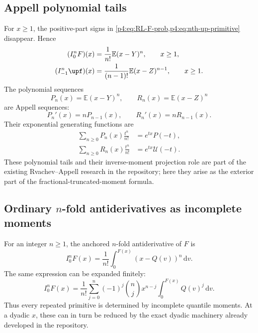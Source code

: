 \documentclass[11pt,oneside]{article}
\theoremstyle{definition}
\theoremstyle{remark}
\newcommand{\F}{F}
\newcommand{\Q}{Q}
\newcommand{\E}{\mathbb E}
\newcommand{\dd}{\,\mathrm d}
\newcommand{\1}{\mathbf 1}
\begin{document}
\subsection{Appell polynomial tails}

For \(x\ge1\), the positive-part signs in \cref{p4:eq:RL-F-prob,p4:eq:nth-up-primitive}
disappear.  Hence
\begin{align}
 (I_0^n\F)(x)&=\frac1{n!}\E(x-Y)^n,\qquad x\ge1,
 \label{p4:eq:F-Appell-tail}\\
 (I_{-1}^n\upf)(x)&=\frac1{(n-1)!}\E(x-Z)^{n-1},\qquad x\ge1.
 \label{p4:eq:up-Appell-tail}
\end{align}
The polynomial sequences
\begin{equation}\label{p4:eq:Appell-polynomials}
 P_n(x)=\E(x-Y)^n,
 \qquad R_n(x)=\E(x-Z)^n
\end{equation}
are Appell sequences:
\begin{equation}\label{p4:eq:Appell-derivative}
 P_n'(x)=nP_{n-1}(x),\qquad R_n'(x)=nR_{n-1}(x).
\end{equation}
Their exponential generating functions are
\begin{align}
 \sum_{n\ge0}P_n(x)\frac{t^n}{n!}
 &=e^{tx}P(-t),\label{p4:eq:Pn-egf}\\
 \sum_{n\ge0}R_n(x)\frac{t^n}{n!}
 &=e^{tx}\mathcal U(-t).\label{p4:eq:Rn-egf}
\end{align}
These polynomial tails and their inverse-moment projection role are part of the existing
Rvachev--Appell research in the repository; here they arise as the exterior part of the
fractional-truncated-moment formula.

\subsection{Ordinary \(n\)-fold antiderivatives as incomplete moments}

For an integer \(n\ge1\), the anchored \(n\)-fold antiderivative of \(\F\) is
\begin{equation}\label{p4:eq:nth-F-primitive}
 I_0^n\F(x)=\frac1{n!}
 \int_0^{\F(x)}(x-\Q(v))^n\dd v.
\end{equation}
The same expression can be expanded finitely:
\begin{equation}\label{p4:eq:nth-F-incomplete-moments}
 I_0^n\F(x)
 =\frac1{n!}\sum_{j=0}^n(-1)^j\binom njx^{n-j}
 \int_0^{\F(x)}\Q(v)^j\dd v.
\end{equation}
Thus every repeated primitive is determined by incomplete quantile moments.  At a dyadic
\(x\), these can in turn be reduced by the exact dyadic machinery already developed in
the repository.
\end{document}
